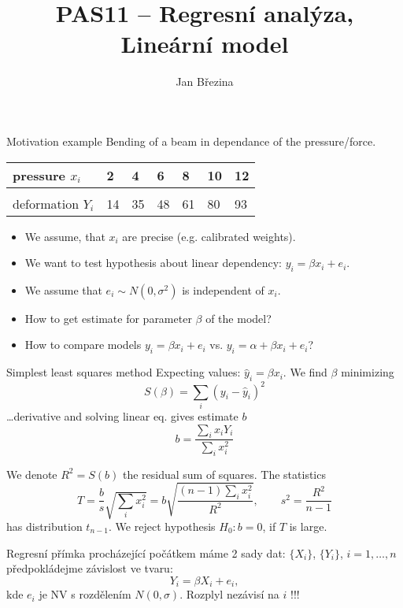\documentclass[smaller]{beamer}
\title{PAS11 -- Regresní analýza, Lineární model}
\author{Jan B\v rezina}
\institute %
{
  Technical University of Liberec
}
\def\df#1{{\usebeamercolor[fg]{my orange} #1}}
\def\xskip{{\vspace{2ex}}}
\begin{document}
\begin{frame}
  \titlepage
\end{frame}


\begin{frame}{Motivation example}
 Bending of a beam in dependance of the pressure/force.

 \begin{center}
\begin{tabular}{l|llllll}
pressure $x_i$ & 2 & 4 & 6 & 8 & 10 & 12\\
\hline\\
deformation $Y_i$ & 14 & 35 & 48 & 61 & 80 & 93\\
\end{tabular}
\end{center}

\xskip
\begin{itemize}
  \item We assume, that $x_i$ are precise (e.g. calibrated weights).
  \item We want to test hypothesis about linear dependency: $y_i= \beta x_i + e_i$.
  \item We assume that $e_i \sim N(0,\sigma^2)$ is independent of $x_i$.
  \item How to get estimate for parameter $\beta$ of the model?
  \item How to compare models $y_i=\beta x_i+e_i$ vs. $y_i=\alpha + \beta x_i +e_i$?
\end{itemize}  
\end{frame}

\begin{frame}{Simplest least squares method}
 Expecting values: $\hat{y}_i = \beta x_i$. We find $\beta$ minimizing
 \[
     S(\beta)= \sum_i (y_i - \hat{y}_i)^2 
 \]
 \dots derivative and solving linear eq. gives estimate $b$
 \[
    b=\frac{\sum_i x_i Y_i}{\sum_i x_i^2}
 \]
 
 We denote $R^2=S(b)$ the \df{residual sum of squares}. The statistics
 \[
    T=\frac{b}{s}\sqrt{\sum_i x_i^2}= b\sqrt{\frac{(n-1)\sum_i x_i^2}{R^2}}, \qquad s^2 = \frac{R^2}{n-1}
 \]
 has distribution $t_{n-1}$. We reject hypothesis $H_0: b=0$, if $T$ is large.
\end{frame}


\begin{frame}{Regresní přímka procházející počátkem}
 máme 2 sady dat: $\{X_i\}$, $\{Y_i\}$, $i=1,\dots,n$
 předpokládejme závislost ve tvaru:
 \[
    Y_i = \beta X_i + e_i,
 \]
 kde $e_i$ je NV s rozdělením $N(0,\sigma)$. Rozplyl nezávisí na $i$ !!! 
 
\end{frame}
\end{document}
